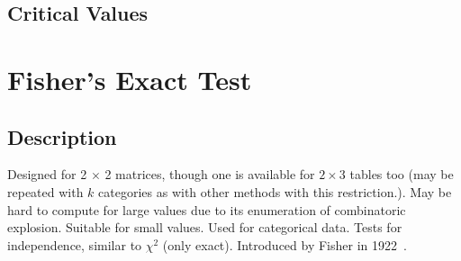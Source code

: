 \documentclass[11pt]{article}
\begin{document}
\subsection{Critical Values}














\section{Fisher's Exact Test}
\label{section:fisherexact}
\subsection{Description}
Designed for 2 $\times$ 2 matrices, though one is available for $2\times 3$ tables too (may be repeated with $k$ categories as with other methods with this restriction.).
May be hard to compute for large values due to its enumeration of combinatoric explosion.  
Suitable for small values.  
Used for categorical data.  
Tests for independence, similar to $\chi^2$ (only exact). 
Introduced by Fisher in 1922~\cite{fisher1922interpretation}.

\end{document}
